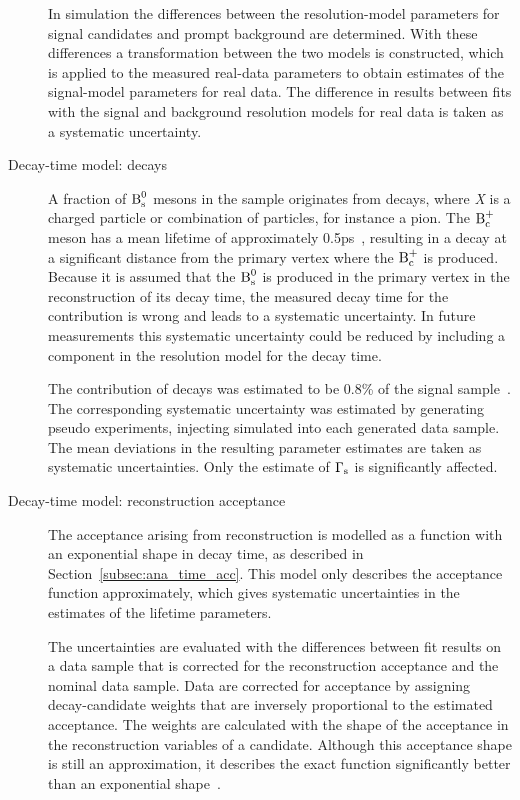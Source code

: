 \begin{description}
In simulation the differences between the resolution-model parameters for signal candidates and prompt background are determined. With
these differences a transformation between the two models is constructed, which is applied to the measured real-data parameters to obtain
estimates of the signal-model parameters for real data. The difference in results between fits with the signal and background
resolution models for real data is taken as a systematic uncertainty.

\item[Decay-time model: \BctoBsX{} decays]
A fraction of $\text{B}_\text{s}^\text{0}$ mesons in the \BstoJpsiKK{} sample originates from \BctoBsX{} decays, where \textit{X} is a charged particle or
combination of particles, for instance a pion. The $\text{B}_\text{c}^\text{+}$ meson has a mean lifetime of approximately 0.5\unitsp{}ps~\cite{PDG}, resulting in
a decay at a significant distance from the primary vertex where the $\text{B}_\text{c}^\text{+}$ is produced. Because it is assumed that the $\text{B}_\text{s}^\text{0}$ is produced in
the primary vertex in the reconstruction of its decay time, the measured decay time for the \BctoBsX{} contribution is wrong and leads to a
systematic uncertainty. In future measurements this systematic uncertainty could be reduced by including a \BctoBsX{} component in the
resolution model for the decay time.

The contribution of \BctoBsX{} decays was estimated to be 0.8\% of the \BstoJpsiKK{} signal sample~\cite{LHCb-ANA-2014-039}. The
corresponding systematic uncertainty was estimated by generating pseudo experiments, injecting simulated \BctoBsJpsiKKX{} into each
generated data sample. The mean deviations in the resulting parameter estimates are taken as systematic uncertainties. Only the estimate of
$\Gamma_\text{s}$ is significantly affected.

\item[Decay-time model: reconstruction acceptance]
The acceptance arising from reconstruction is modelled as a function with an exponential shape in decay time, as described in
Section~\ref{subsec:ana_time_acc}. This model only describes the acceptance function approximately, which gives systematic uncertainties in
the estimates of the lifetime parameters.

The uncertainties are evaluated with the differences between fit results on a data sample that is corrected for the reconstruction
acceptance and the nominal data sample. Data are corrected for acceptance by assigning decay-candidate weights that are inversely
proportional to the estimated acceptance. The weights are calculated with the shape of the acceptance in the reconstruction variables of a
candidate. Although this acceptance shape is still an approximation, it describes the exact function significantly better than an
exponential shape~\cite{LHCb-ANA-2014-039}.


\end{description}
